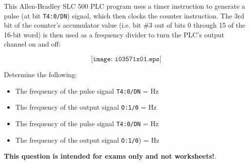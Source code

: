 

This Allen-Bradley SLC 500 PLC program uses a timer instruction to generate a pulse (at bit {\tt T4:0/DN}) signal, which then clocks the counter instruction.  The 3rd bit of the counter's accumulator value (i.e. bit \#3 out of bits 0 through 15 of the 16-bit word) is then used as a frequency divider to turn the PLC's output channel on and off:

$$\texttt{[image: i03571x01.eps]}$$

Determine the following:

\vskip 10pt

\begin{itemize}
\item{} The frequency of the pulse signal {\tt T4:0/DN} = \underbar{\hskip 50pt} Hz
\vskip 10pt
\item{} The frequency of the output signal {\tt O:1/0} = \underbar{\hskip 50pt} Hz
\end{itemize}







\begin{itemize}
\item{} The frequency of the pulse signal {\tt T4:0/DN} =  Hz
\vskip 10pt
\item{} The frequency of the output signal {\tt O:1/0}) =  Hz
\end{itemize}







{\bf This question is intended for exams only and not worksheets!}.


